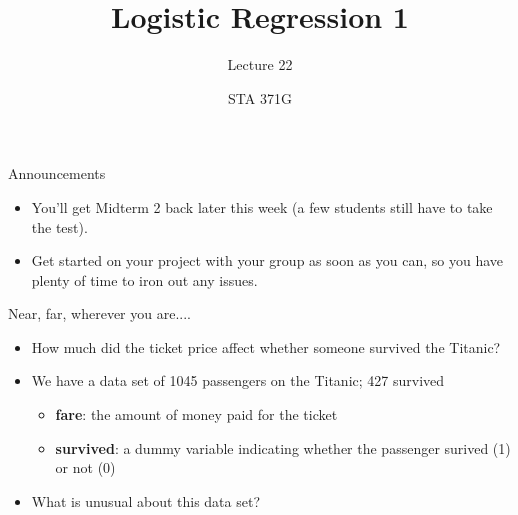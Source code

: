 \documentclass{beamer}\usepackage[]{graphicx}\usepackage[]{color}
\title{Logistic Regression 1}
\subtitle{Lecture 22}
\author{STA 371G}
\makeatletter
\newcommand{\hlopt}[1]{\textcolor[rgb]{1,0.894,0.769}{#1}}%
\newcommand{\hlstd}[1]{\textcolor[rgb]{1,0.894,0.769}{#1}}%
\newcommand{\hlkwb}[1]{\textcolor[rgb]{0.804,0.776,0.451}{#1}}%
\newcommand{\hlkwc}[1]{\textcolor[rgb]{0.78,0.941,0.545}{#1}}%
\newcommand{\hlkwd}[1]{\textcolor[rgb]{1,0.78,0.769}{#1}}%
\newenvironment{kframe}{%
 \def\at@end@of@kframe{}%
 \ifinner\ifhmode%
  \def\at@end@of@kframe{\end{minipage}}%
  \begin{minipage}{\columnwidth}%
 \fi\fi%
 \def\FrameCommand##1{\hskip\@totalleftmargin \hskip-\fboxsep
 \colorbox{shadecolor}{##1}\hskip-\fboxsep
     \hskip-\linewidth \hskip-\@totalleftmargin \hskip\columnwidth}%
 \MakeFramed {\advance\hsize-\width
   \@totalleftmargin\z@ \linewidth\hsize
   \@setminipage}}%
 {\par\unskip\endMakeFramed%
 \at@end@of@kframe}
\newenvironment{knitrout}{}{} %
\makeatother
\begin{document}
  
  

  \frame{\maketitle}



  \begin{darkframes}
    \begin{frame}{Announcements}
      \begin{itemize}[<+->]
        \item You'll get Midterm 2 back later this week (a few students still have to take the test).
        \item Get started on your project with your group as soon as you can, so you have plenty of time to iron out any issues.
      \end{itemize}
    \end{frame}

    \begin{frame}{Near, far, wherever you are....}
      \begin{itemize}
        \item How much did the ticket price affect whether someone survived the Titanic?
        \item We have a data set of 1045 passengers on the Titanic; 427 survived
          \begin{itemize}
            \item \textbf{fare}: the amount of money paid for the ticket
            \item \textbf{survived}: a dummy variable indicating whether the passenger surived (1) or not (0)
          \end{itemize}
        \pause
        \item What is unusual about this data set?
      \end{itemize}
    \end{frame}

\end{darkframes}
\end{document}
